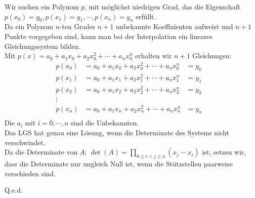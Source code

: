 	Wir suchen ein Polynom $p$, mit möglichst niedrigen Grad, das die Eigenschaft $p(x_0)=y_0,p(x_1)=y_1, \cdots,p(x_n)=y_n$ erfüllt.\\
	Da ein Polynom $n$-ten Grades $n+1$ unbekannte Koeffizienten aufweist und $n+1$ Punkte vorgegeben sind, kann man bei der Interpolation ein lineares Gleichungssystem bilden.\\
	Mit $p(x) = a_0+a_1x_0+a_2x_0^2+ \cdots + a_nx_0^n$ erhalten wir $n+1$ Gleichungen:
	\begin{align*}
	p(x_0) &= a_0+a_1x_0+a_2x_0^2+ \cdots + a_nx_0^n &= y_0\\
	p(x_1) &= a_0+a_1x_1+a_2x_1^2+ \cdots + a_nx_1^n &= y_1\\
	p(x_2) &= a_0+a_1x_2+a_2x_2^2+ \cdots + a_nx_2^n &= y_2\\
	\vdots\\
	p(x_n) &= a_0+a_1x_n+a_2x_n^2+ \cdots + a_nx_n^n &= y_n\\
	\end{align*}
	Die $a_i$ mit $i=0,\cdots,n$ sind die Unbekannten.\\
	Das LGS hat genau eine Lösung, wenn die Determinate des Systems nicht verschwindet.\\
	Da die Determinate von $A$: $\det(A)=\prod \limits_{0 \leq i < j \leq n}(x_j-x_i)$ ist, setzen wir, dass die Determinate nur ungleich Null ist, wenn die Stützstellen paarweise verschieden sind.
	\begin{flushright}
		Q.e.d.
	\end{flushright}



